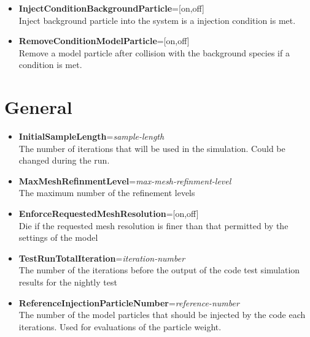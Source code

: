 \begin{itemize}
{\tt CollisionScatteringAngle=isotropic}

Example (function): 

{\tt CollisionScatteringAngle=function $\backslash\backslash$ \\ FunctionName={\it function-name}} 

\item {\bf InjectConditionBackgroundParticle}=[on,off] \\ Inject background particle into the system is a injection condition is met.

\item {\bf RemoveConditionModelParticle}=[on,off] \\ Remove a model particle after collision with the background species if a condition is met.


\end{itemize}












\section{General}

\begin{itemize}
\item {\bf InitialSampleLength}={\it sample-length} \\ The number of iterations that will be used in the simulation. Could be changed during the run.

\item {\bf MaxMeshRefinmentLevel}={\it max-mesh-refinment-level} \\ The maximum number of the refinement levels

\item {\bf EnforceRequestedMeshResolution}=[on,off] \\ Die if the requested mesh resolution is finer than that permitted by the settings of the model

\item {\bf TestRunTotalIteration}={\it iteration-number} \\ The number of the iterations before the output of the code test simulation results for the nightly test

\item {\bf ReferenceInjectionParticleNumber}={\it reference-number} \\ The number of the model particles that should be injected by the code each iterations. Used for evaluations of the particle weight.

\end{itemize}




